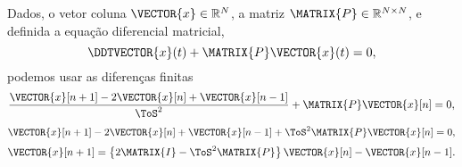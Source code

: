\begin{myproofT}\label{proof:theo:differential-eq-discreto:order2:0}
Dados, o vetor coluna $\VECTOR{x} \in \mathbb{R}^N$, a matriz $\MATRIX{P} \in \mathbb{R}^{N\times N}$, 
e definida a equação diferencial matricial,
\begin{equation}
\DDTVECTOR{x}(t) + \MATRIX{P} \VECTOR{x}(t)=0,
\end{equation}
podemos usar as diferenças finitas
\begin{equation}
\frac{\VECTOR{x}[n+1]-2\VECTOR{x}[n]+ \VECTOR{x}[n-1]}{\ToS^2} + \MATRIX{P} \VECTOR{x}[n]=0,
\end{equation}
\begin{equation}
\VECTOR{x}[n+1]-2\VECTOR{x}[n]+ \VECTOR{x}[n-1]  + \ToS^2 \MATRIX{P} \VECTOR{x}[n]=0,
\end{equation}
\begin{equation}
\VECTOR{x}[n+1]  =\left\{2\MATRIX{I}- \ToS^2 \MATRIX{P} \right\}\VECTOR{x}[n] - \VECTOR{x}[n-1].
\end{equation}
\end{myproofT}

